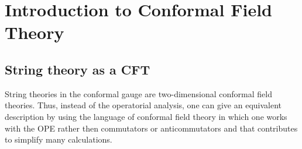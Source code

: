 
\chapter{Introduction to Conformal Field Theory}

\section{String theory as a CFT}
\par String theories in the conformal gauge are two-dimensional
conformal field theories. Thus, instead of the operatorial analysis, one can give an equivalent description
by using the language of conformal field theory in which one works with the
OPE rather then commutators or anticommutators and that contributes to
simplify many calculations. 
